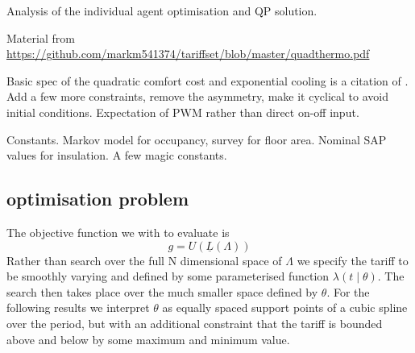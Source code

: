 \documentclass[a4paper, 10 pt, conference]{ieeeconf}  %
\begin{document}
Analysis of the individual agent optimisation and QP solution.

Material from \url{https://github.com/markm541374/tariffset/blob/master/quadthermo.pdf}

Basic spec of the quadratic comfort cost and exponential cooling is a citation of \cite{ramchurn2011agent}. Add a few more constraints, remove the asymmetry, make it cyclical to avoid initial conditions. Expectation of PWM rather than direct on-off input.

Constants. Markov model for occupancy, survey for floor area. Nominal SAP values for insulation. A few magic constants.

\subsection{optimisation problem}
The objective function we with to evaluate is
\begin{equation}
g = U(\underline{L}(\Lambda))
\end{equation}
Rather than search over the full N dimensional space of $\Lambda$ we specify the tariff to be smoothly varying and defined by some parameterised function $\lambda(t \mid \theta)$. The search then takes place over the much smaller space defined by $\theta$. For the following results we interpret $\theta$ as equally spaced support points of a cubic spline over the period, but with an additional constraint that the tariff is bounded above and below by some maximum and minimum value.
\end{document}
